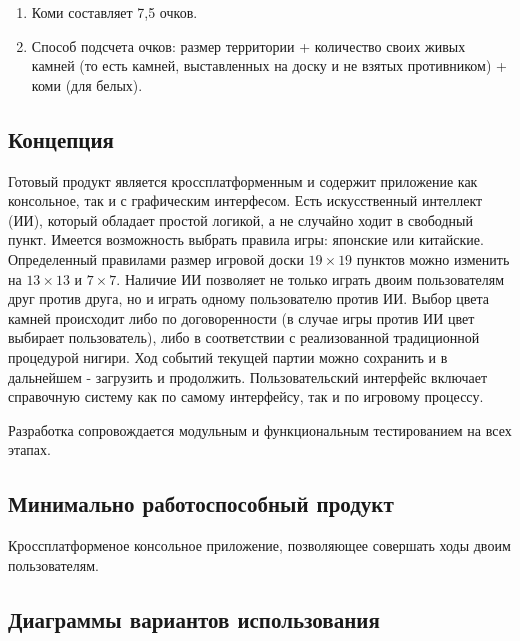 \begin{enumerate}

\item Коми составляет 7,5 очков.\\
\item Способ подсчета очков: размер территории + количество своих живых камней (то есть камней, выставленных на доску и не взятых противником) + коми (для белых).\\

\end{enumerate}
 
\subsection*{Концепция}

  Готовый продукт является кроссплатформенным и содержит приложение как консольное, так и с графическим интерфесом. Есть искусственный интеллект (ИИ), который обладает простой логикой, а не случайно ходит в свободный пункт. Имеется возможность выбрать правила игры: японские или китайские. Определенный правилами размер игровой доски $19 \times 19$ пунктов можно изменить на $13 \times 13$ и $7 \times 7$. Наличие ИИ позволяет не только играть двоим пользователям друг против друга, но и играть одному пользователю против ИИ. Выбор цвета камней происходит либо по договоренности (в случае игры против ИИ цвет выбирает пользователь), либо в соответствии с реализованной традиционной процедурой нигири. Ход событий текущей партии можно сохранить и в дальнейшем - загрузить и продолжить. Пользовательский интерфейс включает справочную систему как по самому интерфейсу, так и по игровому процессу.
  
  Разработка сопровождается модульным и функциональным тестированием на всех этапах.

\subsection*{Минимально работоспособный продукт}

 Кроссплатформеное консольное приложение, позволяющее совершать ходы двоим пользователям.
  
\subsection*{Диаграммы вариантов использования}

